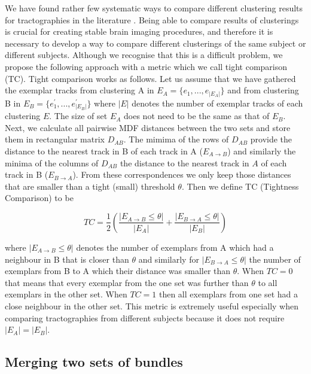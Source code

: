 \documentclass[preprint,authoryear,a4paper,10pt,onecolumn]{elsarticle}
\begin{document}
We have found rather few systematic ways to compare different clustering
results for tractographies in the literature
\citep{moberts2005evaluation}.  Being able to compare results of
clusterings is crucial for creating stable brain imaging procedures, and
therefore it is necessary to develop a way to compare different
clusterings of the same subject or different subjects. Although we
recognise that this is a difficult problem, we propose the following
approach with a metric which we call tight comparison (TC). Tight
comparison works as follows. Let us assume that we have gathered the
exemplar tracks from clustering A in $E_{A}=\{e_{1},...,e_{|E_{A}|}\}$
and from clustering B in $E_{B}=\{e_{1}^{'},...,e_{|E_{B}|}^{'}\}$ where
$|E|$ denotes the number of exemplar tracks of each clustering $E$. The
size of set $E_{A}$ does not need to be the same as that of
$E_{B}$. Next, we calculate all pairwise MDF distances between the two
sets and store them in rectangular matrix $D_{AB}$. The mimima of the
rows of $D_{AB}$ provide the distance to the nearest track in B of each
track in A ($E_{A\rightarrow B}$) and similarly the minima of the
columns of $D_{AB}$ the distance to the nearest track in $A$ of each
track in B ($E_{B\rightarrow A}$). From these correspondences we only
keep those distances that are smaller than a tight (small) threshold
$\theta$. Then we define TC (Tightness Comparison) to be

\begin{equation}
TC=\frac{1}{2}\left(\frac{|E_{A\rightarrow B}\leq \theta |}{|E_{A}|}+\frac{|E_{B\rightarrow A}\leq \theta |}{|E_{B}|}\right)\label{eq:TC}
\end{equation}


where $|E_{A\rightarrow B}\leq \theta |$ denotes the number of
exemplars from A which had a neighbour in B that is closer than
$\theta$ and similarly for $|E_{B\rightarrow A}\leq
\theta |$ the number of exemplars from B to A which their
distance was smaller than $\theta$. When $TC=0$ that means
that every exemplar from the one set was further than $\theta$
to all exemplars in the other set. When $TC=1$ then all exemplars from
one set had a close neighbour in the other set. This metric is extremely
useful especially when comparing tractographies from different subjects
because it does not require $|E_{A}|=|E_{B}|$.

\subsection{Merging two sets of bundles\label{sub:merging}}
\end{document}
